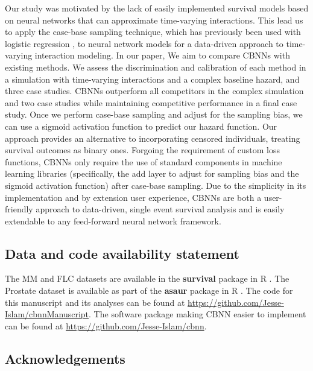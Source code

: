 \documentclass[preprint,12pt]{elsarticle}
\begin{document}
Our study was motivated by the lack of easily implemented survival models based on neural networks that can approximate time-varying interactions.
This lead us to apply the case-base sampling technique, which has previously been used with logistic regression \citep{hanley2009}, to neural network models for a data-driven
approach to time-varying interaction modeling. In our paper, We aim to compare CBNNs with existing methods. We assess the discrimination and calibration
of each method in a simulation with time-varying interactions and a complex baseline hazard, and three case studies. CBNNs outperform all competitors in
the complex simulation and two case studies while maintaining competitive performance in a final case study. Once we perform case-base sampling and
adjust for the sampling bias, we can use a sigmoid activation function to predict our hazard function. Our approach provides an alternative to incorporating
censored individuals, treating survival outcomes as binary ones. Forgoing the requirement of custom loss functions, CBNNs only require the use of standard
components in machine learning libraries (specifically, the add layer to adjust for sampling bias and the sigmoid activation function) after case-base sampling.
Due to the simplicity in its implementation and by extension user experience, CBNNs are both a user-friendly approach to data-driven, single event survival analysis and is
easily extendable to any feed-forward neural network framework.


\hypertarget{data-and-code-availability-statement}{%
\subsection*{Data and code availability
statement}\label{data-and-code-availability-statement}}


The MM and FLC datasets are available in the \textbf{survival} package in R
\citep{survpkg}. The Prostate dataset is available as part of the \textbf{asaur} package in R \citep{asaur}.
The code for this manuscript and its analyses can be found at \url{https://github.com/Jesse-Islam/cbnnManuscript}. The software package making CBNN
easier to implement can be found at \url{https://github.com/Jesse-Islam/cbnn}.

\hypertarget{acknowledgements}{%
\subsection*{Acknowledgements}\label{acknowledgements}}
\end{document}
